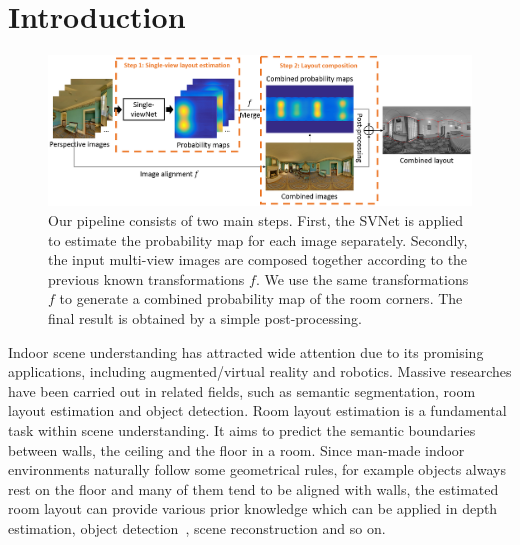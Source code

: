 \section{Introduction}

\begin{figure}
	\centering
	\includegraphics[width=\linewidth]{figs/ppline.png}
	\caption{Our pipeline consists of two main steps. First, the SVNet is applied to estimate the probability map for each image separately. Secondly, the input multi-view images are composed together according to the previous known transformations $f$. We use the same transformations $f$ to generate a combined probability map of the room corners. The final result is obtained by a simple post-processing. }
	\label{fig:overview}
\end{figure}

Indoor scene understanding has attracted wide attention due to its promising applications, including augmented/virtual reality and robotics. Massive researches have been carried out in related fields, such as semantic segmentation, room layout estimation and object detection. 
Room layout estimation is a fundamental task within scene understanding. It aims to predict the semantic boundaries between walls, the ceiling and the floor in a room. 
Since man-made indoor environments naturally follow some geometrical rules, for example objects always rest on the floor and many of them tend to be aligned with walls, the estimated room layout can provide various prior knowledge which can be applied in depth estimation, object detection~\cite{hedau2010thinking}, scene reconstruction \cite{lee2017joint} and so on.


